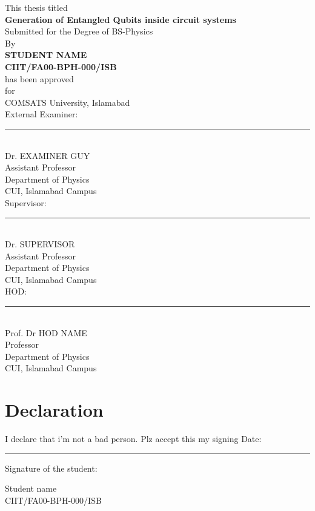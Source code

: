 \documentclass[12pt,two side]{report}
\begin{document}
\begin{titlepage}
\noindent
\centering
This thesis titled\\\vspace{0.5cm}
{\Large \textbf {Generation of Entangled Qubits inside circuit systems}}
\vspace{0.3cm}\\
Submitted for the Degree of BS-Physics
\vspace{0.3cm}\\
By
\vspace{0.3cm}\\
\textbf{STUDENT NAME}\\
\textbf{CIIT/FA00-BPH-000/ISB}
\vspace{0.3cm}\\
has been approved\\
for\\
COMSATS University, Islamabad \vspace{0.5cm}\\
\justify
External Examiner: \noindent\rule{8cm}{0.4pt}\\
\centering
     Dr. EXAMINER GUY\\
	Assistant Professor\\
	Department of Physics\\
	CUI, Islamabad Campus
	\vspace{0.3cm}\\
\justify
Supervisor: \hspace{1.35cm}\noindent\rule{8cm}{0.4pt}\\
\centering
	Dr. SUPERVISOR\\
	Assistant Professor\\
	Department of Physics\\
	CUI, Islamabad Campus \vspace{0.3cm}\\
\justify
HOD: \hspace{2.8cm}\noindent\rule{8cm}{0.4pt}\\
\centering
	Prof. Dr HOD NAME\\
	Professor\\
	Department of Physics\\
	CUI, Islamabad Campus
\end{titlepage}
\noindent
\chapter*{Declaration}
\justify
I declare that i'm not a bad person. Plz accept this my signing  \vfill
Date: \hspace{0.2cm}\noindent\rule{4cm}{0.4pt}\hfill  Signature of the student: \vspace{3cm} \\
\begin{flushright}
Student name \\   CIIT/FA00-BPH-000/ISB 
\end{flushright}
\noindent
\end{document}
